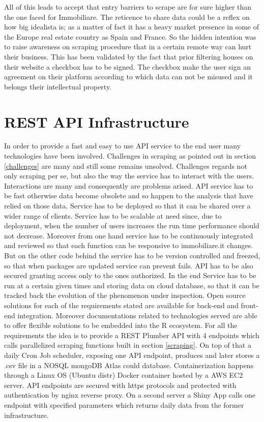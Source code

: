 \documentclass[
  12pt,
  a4paper,
  oneside]{book}
\begin{document}
All of this leads to accept that entry barriers to scrape are for sure higher than the one faced for Immobiliare. The reticence to share data could be a reflex on how big idealista is; as a matter of fact it has a heavy market presence in some of the Europe real estate country as Spain and France. So the hidden intention was to raise awareness on scraping procedure that in a certain remote way can hurt their business. This has been validated by the fact that prior filtering houses on their website a checkbox has to be signed. The checkbox make the user sign an agreement on their platform according to which data can not be misused and it belongs their intellectual property.

\hypertarget{Infrastructure}{%
\chapter{REST API Infrastructure}\label{Infrastructure}}

In order to provide a fast and easy to use API service to the end user many technologies have been involved. Challenges in scraping as pointed out in section \ref{challenges} are many and still some remains unsolved. Challenges regards not only scraping per se, but also the way the service has to interact with the users. Interactions are many and consequently are problems arised. API service has to be fast otherwise data become obsolete and so happen to the analysis that have relied on those data. Service has to be deployed so that it can be shared over a wider range of clients. Service has to be scalable at need since, due to deployment, when the number of users increases the run time performance should not decrease. Moreover from one hand service has to be continuously integrated and reviewed so that each function can be responsive to immobiliare.it changes. But on the other code behind the service has to be version controlled and freezed, so that when packages are updated service can prevent fails. API has to be also secured granting access only to the ones authorized. In the end Service has to be run at a certain given times and storing data on cloud database, so that it can be tracked back the evolution of the phenomenon under inspection.
Open source solutions for each of the requirements stated are available for back-end and front-end integration. Moreover documentations related to technologies served are able to offer flexible solutions to be embedded into the R ecosystem.
For all the requirements the idea is to provide a REST Plumber API with 4 endpoints which calls parallelized scraping functions built in section \ref{scraping}. On top of that a daily Cron Job scheduler, exposing one API endpoint, produces and later stores a .csv file in a NOSQL mongoDB Atlas could database. Containerization happens through a Linux OS (Ubuntu distr) Docker container hosted by a AWS EC2 server. API endpoints are secured with https protocols and protected with authentication by nginx reverse proxy. On a second server a Shiny App calls one endpoint with specified parameters which returns daily data from the former infrastructure.
\end{document}
